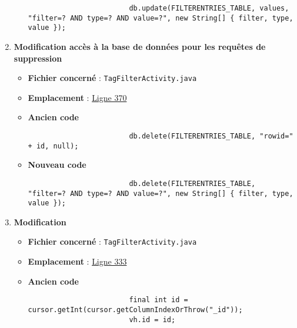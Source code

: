\begin{enumerate}
\begin{itemize}
                    \begin{verbatim}
                        db.update(FILTERENTRIES_TABLE, values, "filter=? AND type=? AND value=?", new String[] { filter, type, value });
                    \end{verbatim}
          \end{itemize}
    \item \textbf{Modification accès à la base de données pour les requêtes de suppression}
          \begin{itemize}
              \item \textbf{Fichier concerné} : \texttt{TagFilterActivity.java}
              \item \textbf{Emplacement} :
                    \href{https://github.com/MarcusWolschon/osmeditor4android/blob/dcabe8084aa15f5551a37c990516bf73398af1bf/src/main/java/de/blau/android/filter/TagFilterActivity.java#L370}{Ligne 370}
              \item \textbf{Ancien code}
                    \begin{verbatim}
                        db.delete(FILTERENTRIES_TABLE, "rowid=" + id, null);
                    \end{verbatim}
              \item \textbf{Nouveau code}
                    \begin{verbatim}
                        db.delete(FILTERENTRIES_TABLE, "filter=? AND type=? AND value=?", new String[] { filter, type, value });
                    \end{verbatim}
          \end{itemize}
    \item \textbf{Modification}
          \begin{itemize}
              \item \textbf{Fichier concerné} : \texttt{TagFilterActivity.java}
              \item \textbf{Emplacement} :
                    \href{https://github.com/MarcusWolschon/osmeditor4android/blob/dcabe8084aa15f5551a37c990516bf73398af1bf/src/main/java/de/blau/android/filter/TagFilterActivity.java#L333}{Ligne 333}
              \item \textbf{Ancien code}
                    \begin{verbatim}
                        final int id = cursor.getInt(cursor.getColumnIndexOrThrow("_id"));
                        vh.id = id;
                    \end{verbatim}

\end{itemize}
\end{enumerate}
